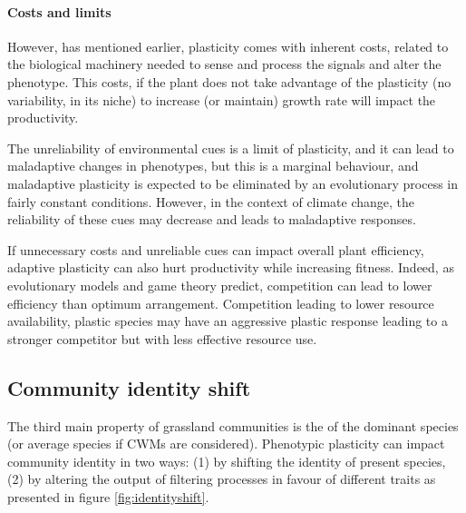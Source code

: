 



\paragraph{Costs and limits}

However, has mentioned earlier, plasticity comes with inherent costs, related to the biological machinery needed to sense and process the signals and alter the phenotype. This costs, if the plant does not take advantage of the plasticity (no variability, in its niche) to increase (or maintain) growth rate will impact the productivity.

The unreliability of environmental cues is a limit of plasticity, and it can lead to maladaptive changes in phenotypes, but this is a marginal behaviour, and maladaptive plasticity is expected to be eliminated by an evolutionary process in fairly constant conditions. However, in the context of climate change, the reliability of these cues may decrease and leads to maladaptive responses. 

If unnecessary costs and unreliable cues can impact overall plant efficiency, adaptive plasticity can also hurt productivity while increasing fitness. Indeed, as evolutionary models and game theory predict, competition can lead to lower efficiency than optimum arrangement. Competition leading to lower resource availability, plastic species may have an aggressive plastic response leading to a stronger competitor but with less effective resource use.


%
%
%


\subsection{Community identity shift}

The third main property of grassland communities is the  of the dominant species (or average species if CWMs are considered). Phenotypic plasticity can impact community identity in two ways: (1) by shifting the identity of present species, (2) by altering the output of filtering processes in favour of different traits as presented in figure \ref{fig:identityshift}.


